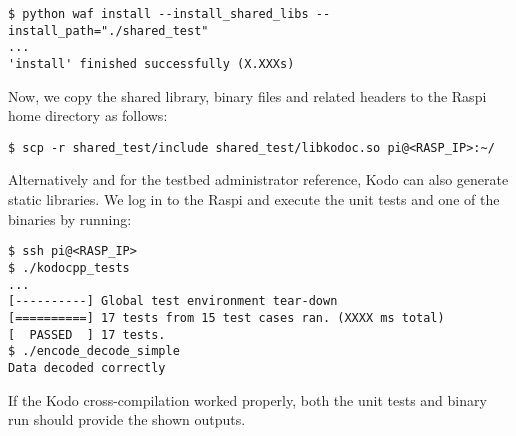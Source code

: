 \begin{lstlisting}[]
$ python waf install --install_shared_libs --install_path="./shared_test"
...
'install' finished successfully (X.XXXs)
\end{lstlisting}
\FloatBarrier
\vspace{-5mm}

Now, we copy the shared library, binary files and related headers to the
\ac{Raspi} home directory as follows:

\begin{lstlisting}[]
$ scp -r shared_test/include shared_test/libkodoc.so pi@<RASP_IP>:~/
\end{lstlisting}
\FloatBarrier
\vspace{-5mm}

Alternatively and for the testbed administrator reference, Kodo can also
generate static libraries. We log in to the \ac{Raspi} and execute the unit
tests and one of the binaries by running:

\begin{lstlisting}[]
$ ssh pi@<RASP_IP>
$ ./kodocpp_tests
...
[----------] Global test environment tear-down
[==========] 17 tests from 15 test cases ran. (XXXX ms total)
[  PASSED  ] 17 tests.
$ ./encode_decode_simple
Data decoded correctly
\end{lstlisting}
\FloatBarrier
\vspace{-5mm}

If the Kodo cross-compilation worked properly, both the unit tests and
binary run should provide the shown outputs.


